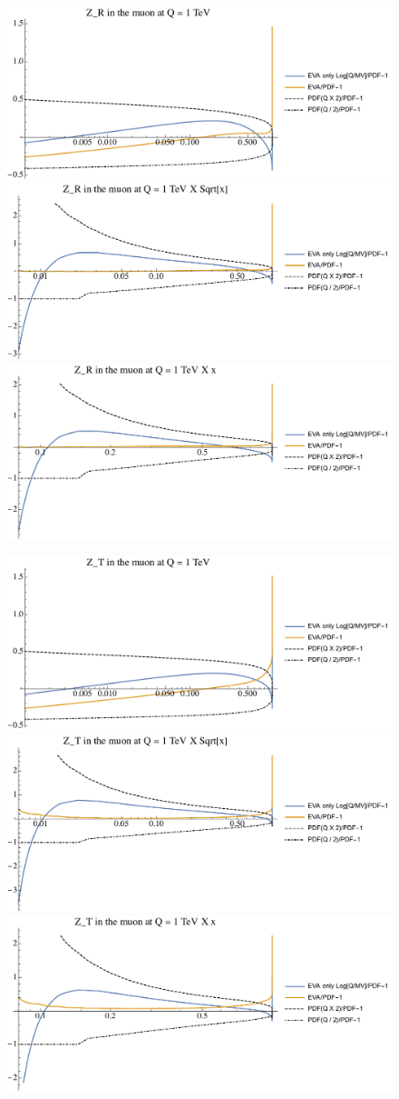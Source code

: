 \documentclass[a4paper,11pt]{article}
\begin{document}
\begin{figure}[ht]
\includegraphics[width=0.46\linewidth]{PlotPDFs/ratios/1TeV/Z_R_Q.pdf}
\includegraphics[width=0.46\linewidth]{PlotPDFs/ratios/1TeV/Z_R_Qsqrtx.pdf}
\includegraphics[width=0.46\linewidth]{PlotPDFs/ratios/1TeV/Z_R_Qx.pdf}
\end{figure}

\begin{figure}[ht]
\includegraphics[width=0.46\linewidth]{PlotPDFs/ratios/1TeV/Z_T_Q.pdf}
\includegraphics[width=0.46\linewidth]{PlotPDFs/ratios/1TeV/Z_T_Qsqrtx.pdf}
\includegraphics[width=0.46\linewidth]{PlotPDFs/ratios/1TeV/Z_T_Qx.pdf}
\end{figure}
\end{document}
